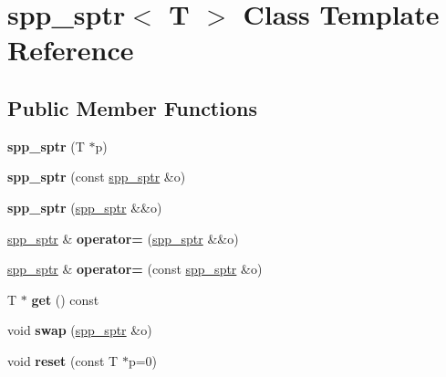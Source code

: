\hypertarget{classspp__sptr}{}\section{spp\+\_\+sptr$<$ T $>$ Class Template Reference}
\label{classspp__sptr}
\subsection*{Public Member Functions}
\begin{DoxyCompactItemize}
\item 
{\bfseries spp\+\_\+sptr} (T $\ast$p)\hypertarget{classspp__sptr_a00dd3b73faba3275f934cb1592ece504}{}\label{classspp__sptr_a00dd3b73faba3275f934cb1592ece504}

\item 
{\bfseries spp\+\_\+sptr} (const \hyperlink{classspp__sptr}{spp\+\_\+sptr} \&o)\hypertarget{classspp__sptr_ac57491f49b4cacd789eb57107d8b277a}{}\label{classspp__sptr_ac57491f49b4cacd789eb57107d8b277a}

\item 
{\bfseries spp\+\_\+sptr} (\hyperlink{classspp__sptr}{spp\+\_\+sptr} \&\&o)\hypertarget{classspp__sptr_aeec42cbb432314eec96307eb06a3d654}{}\label{classspp__sptr_aeec42cbb432314eec96307eb06a3d654}

\item 
\hyperlink{classspp__sptr}{spp\+\_\+sptr} \& {\bfseries operator=} (\hyperlink{classspp__sptr}{spp\+\_\+sptr} \&\&o)\hypertarget{classspp__sptr_aedeb4ab08afbb4c712665633b9f31fc1}{}\label{classspp__sptr_aedeb4ab08afbb4c712665633b9f31fc1}

\item 
\hyperlink{classspp__sptr}{spp\+\_\+sptr} \& {\bfseries operator=} (const \hyperlink{classspp__sptr}{spp\+\_\+sptr} \&o)\hypertarget{classspp__sptr_a5304c403155c9fe07715d20f61b94780}{}\label{classspp__sptr_a5304c403155c9fe07715d20f61b94780}

\item 
T $\ast$ {\bfseries get} () const \hypertarget{classspp__sptr_afa45ca013c78975a83dbeab113ad270e}{}\label{classspp__sptr_afa45ca013c78975a83dbeab113ad270e}

\item 
void {\bfseries swap} (\hyperlink{classspp__sptr}{spp\+\_\+sptr} \&o)\hypertarget{classspp__sptr_aef82e168827c18df4523051bd6b59f88}{}\label{classspp__sptr_aef82e168827c18df4523051bd6b59f88}

\item 
void {\bfseries reset} (const T $\ast$p=0)\hypertarget{classspp__sptr_a342aa1bb01e82762db3cfc9f5036a135}{}\label{classspp__sptr_a342aa1bb01e82762db3cfc9f5036a135}


\end{DoxyCompactItemize}

